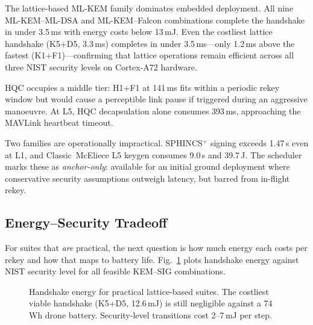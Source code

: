 \documentclass[conference]{IEEEtran}
\begin{document}
The lattice-based ML-KEM family dominates embedded deployment.
All nine ML-KEM--ML-DSA and ML-KEM--Falcon combinations complete
the handshake in under 3.5\,ms with energy costs below 13\,mJ.
Even the costliest lattice handshake (K5+D5, 3.3\,ms) completes
in under 3.5\,ms---only 1.2\,ms above the fastest (K1+F1)---confirming
that lattice operations remain efficient across all three NIST
security levels on Cortex-A72 hardware.

HQC occupies a middle tier: H1+F1 at 141\,ms fits within
a periodic rekey window but would cause a perceptible link pause
if triggered during an aggressive manoeuvre.  At L5, HQC
decapsulation alone consumes 393\,ms, approaching the MAVLink
heartbeat timeout.

Two families are operationally impractical.  SPHINCS$^+$ signing
exceeds 1.47\,s even at L1, and Classic~McEliece L5 keygen consumes
9.0\,s and 39.7\,J.  The scheduler marks these as \emph{anchor-only}:
available for an initial ground deployment where conservative
security assumptions outweigh latency, but barred from in-flight
rekey.


\subsection{Energy--Security Tradeoff}
\label{sec:energy}

For suites that \emph{are} practical, the next question is how much
energy each costs per rekey and how that maps to battery life.
Fig.~\ref{fig:energy-security} plots handshake energy against NIST
security level for all feasible KEM--SIG combinations.

\begin{figure}[t]
\centering
{}
\caption{Handshake energy for practical lattice-based suites.
  The costliest viable handshake (K5+D5, 12.6\,mJ) is still
  negligible against a 74\,Wh drone battery.  Security-level
  transitions cost 2--7\,mJ per step.}
\label{fig:energy-security}
\end{figure}
\end{document}
